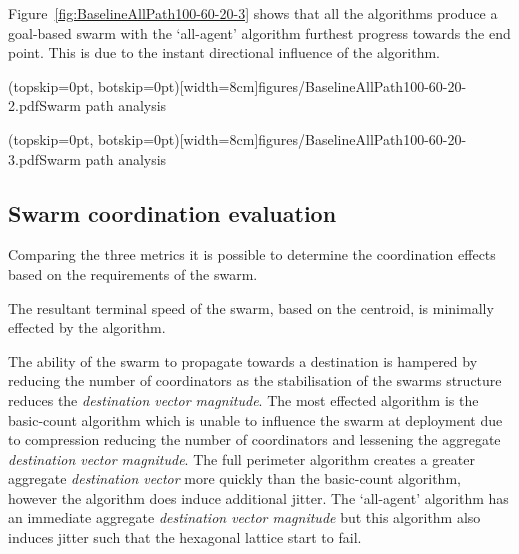 \documentclass{ieeeaccess}
\begin{document}
Figure~\ref{fig:BaselineAllPath100-60-20-3} shows that all the algorithms produce a goal-based swarm with the `all-agent' algorithm furthest progress towards the end point. This is due to the instant directional influence of the algorithm. 


\Figure[t!](topskip=0pt, botskip=0pt)[width=8cm]{figures/BaselineAllPath100-60-20-2.pdf}{Swarm path analysis\label{fig:BaselineAllPath100-60-20-2}}


\Figure[t!](topskip=0pt, botskip=0pt)[width=8cm]{figures/BaselineAllPath100-60-20-3.pdf}{Swarm path analysis\label{fig:BaselineAllPath100-60-20-3}}

\subsection{Swarm coordination evaluation\label{reduced:coordinationEvaluation}}
Comparing the three metrics it is possible to determine the coordination effects based on the requirements of the swarm.

The resultant terminal speed of the swarm, based on the centroid, is minimally effected by the algorithm. 

The ability of the swarm to propagate towards a destination is hampered by reducing the number of coordinators as the stabilisation of the swarms structure reduces the \textit{destination vector magnitude}. The most effected algorithm is the basic-count algorithm which is unable to influence the swarm at deployment due to compression reducing the number of coordinators and lessening the aggregate \textit{destination vector magnitude}. The full perimeter algorithm creates a greater aggregate \textit{destination vector} more quickly than the basic-count algorithm, however the algorithm does induce additional jitter. The `all-agent' algorithm has an immediate aggregate \textit{destination vector magnitude} but this algorithm also induces jitter such that the hexagonal lattice start to fail.
 
\end{document}
